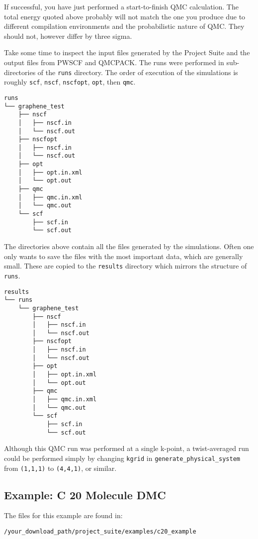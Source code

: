 \documentclass[oneside,11pt]{memoir}
\numberwithin{equation}{section}
\begin{document}
If successful, you have just performed a start-to-finish QMC calculation.  
The total energy quoted above probably will not match the one you produce 
due to different compilation environments and the probabilistic nature of 
QMC.  They should not, however differ by three sigma.

Take some time to inspect the input files generated by the Project Suite and 
the output files from PWSCF and QMCPACK.  The runs were performed in 
sub-directories of the \texttt{runs} directory.  The order of execution of 
the simulations is roughly \texttt{scf}, \texttt{nscf}, \texttt{nscfopt}, 
\texttt{opt}, then \texttt{qmc}.

\begin{shaded}
\begin{verbatim}
runs
└── graphene_test
    ├── nscf
    │   ├── nscf.in
    │   └── nscf.out
    ├── nscfopt
    │   ├── nscf.in
    │   └── nscf.out
    ├── opt
    │   ├── opt.in.xml
    │   └── opt.out
    ├── qmc
    │   ├── qmc.in.xml
    │   └── qmc.out
    └── scf
        ├── scf.in
        └── scf.out
\end{verbatim}
\end{shaded}

The directories above contain all the files generated by the simulations.  
Often one only wants to save the files with the most important data, which 
are generally small.  These are copied to the \texttt{results} directory 
which mirrors the structure of \texttt{runs}. 

\begin{shaded}
\begin{verbatim}
results
└── runs
    └── graphene_test
        ├── nscf
        │   ├── nscf.in
        │   └── nscf.out
        ├── nscfopt
        │   ├── nscf.in
        │   └── nscf.out
        ├── opt
        │   ├── opt.in.xml
        │   └── opt.out
        ├── qmc
        │   ├── qmc.in.xml
        │   └── qmc.out
        └── scf
            ├── scf.in
            └── scf.out
\end{verbatim}
\end{shaded}

Although this QMC run was performed at a single k-point, a twist-averaged run 
could be performed simply by changing \texttt{kgrid} in 
\texttt{generate\_physical\_system} from \texttt{(1,1,1)} to \texttt{(4,4,1)}, 
or similar.
 

\pagebreak
\subsection{Example: C 20 Molecule DMC}  \label{c20_dmc}
The files for this example are found in:
\begin{shaded}
\begin{verbatim}
/your_download_path/project_suite/examples/c20_example
\end{verbatim}
\end{shaded}
\end{document}
